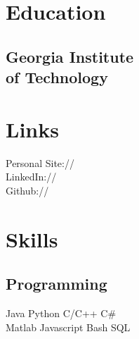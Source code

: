 \documentclass[]{deedy-resume-openfont}
\begin{document}
%
%
\lastupdated

%
%



%
%

\begin{minipage}[t]{0.33\textwidth} 


\section{Education} 

\subsection{Georgia Institute \\ of Technology}
\sectionsep


\section{Links} 
Personal Site://  \href{www.albertoli.tech}{} \\
LinkedIn://  \href{https://www.linkedin.com/in/alberto-li-127410b9/}{} \\
Github:// \href{https://www.github.com/albertoli}{}
\sectionsep


\section{Skills}
\subsection{Programming}
Java \textbullet{} Python \textbullet{} C/C++ \textbullet{} C\#\\
Matlab \textbullet{} Javascript \textbullet{}Bash \textbullet{} SQL
\sectionsep


\end{minipage}
\end{document}
